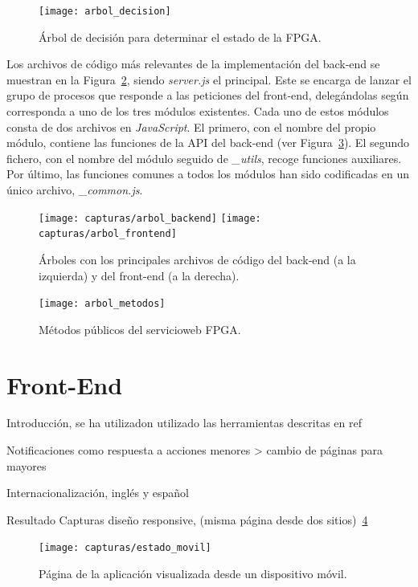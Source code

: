 \begin{figure}[!htp]
  \centering
  \texttt{[image: arbol\_decision]}
  \caption{Árbol de decisión para determinar el estado de la \gls{FPGA}.}
  \label{fig:arbol_decision}
\end{figure}

Los archivos de código más relevantes de la implementación del \gls{back-end} se muestran en la Figura~\ref{fig:arbol_codigo}, siendo \textit{server.js} el principal. Este se encarga de lanzar el grupo de procesos que responde a las peticiones del \gls{front-end}, delegándolas según corresponda a uno de los tres módulos existentes.
Cada uno de estos módulos consta de dos archivos en \textit{JavaScript}.
El primero, con el nombre del propio módulo, contiene las funciones de la \gls{API} del \gls{back-end} (ver Figura~\ref{fig:arbol_metodos}).
El segundo fichero, con el nombre del módulo seguido de \textit{\_utils}, recoge funciones auxiliares.
Por último, las funciones comunes a todos los módulos han sido codificadas en un único archivo, \textit{\_common.js}.

\begin{figure}[!htp]
  \begin{center}
    \texttt{[image: capturas/arbol\_backend]}
    \hspace{1cm}
    \texttt{[image: capturas/arbol\_frontend]}
  \caption{Árboles con los principales archivos de código del \gls{back-end} (a la izquierda) y del \gls{front-end} (a la derecha).}
  \label{fig:arbol_codigo}
  \end{center}
\end{figure}

\begin{figure}[!htp]
  \centering
  \texttt{[image: arbol\_metodos]}
  \caption{Métodos públicos del \gls{servicioweb} \gls{FPGA}.}
  \label{fig:arbol_metodos}
\end{figure}

\section{Front-End\label{sec:imp:front_end}}

Introducción, se ha utilizadon utilizado las herramientas descritas en ref

Notificaciones como respuesta a acciones menores > cambio de páginas para mayores

Internacionalización, inglés y español

Resultado Capturas diseño responsive,  (misma página desde dos sitios)~\ref{fig:captura:movil}
\begin{figure}[!htp]
  \centering
  \texttt{[image: capturas/estado\_movil]}
  \caption{Página de la aplicación visualizada desde un dispositivo móvil.}
  \label{fig:captura:movil}
\end{figure}

